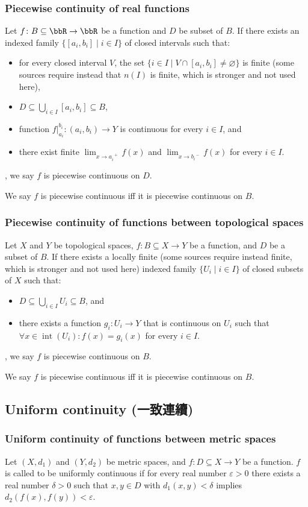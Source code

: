 \begin{itemize}
\begin{itemize}
\subsubsection{Piecewise continuity of real functions}
Let $f\colon B\subseteq\bbR\to\bbR$ be a function and $D$ be subset of $B$. If there exists an indexed family $\{[a_i,b_i]\mid i\in I\}$ of closed intervals such that:
\begin{itemize}
\item for every closed interval $V$, the set $\{i\in I\mid V\cap [a_i,b_i]\neq\varnothing\}$ is finite (some sources require instead that $n(I)$ is finite, which is stronger and not used here),
\item $D\subseteq\bigcup_{i\in I}[a_i,b_i]\subseteq B$,
\item function $f\big\vert_{a_i}^{b_i}\colon(a_i,b_i)\to Y$ is continuous for every $i\in I$, and
\item there exist finite $\lim_{x\to a_i^{\phantom{i}+}}f(x)$ and $\lim_{x\to b_i^{\phantom{i}-}}f(x)$ for every $i\in I$.
\end{itemize},
we say $f$ is piecewise continuous on $D$.

We say $f$ is piecewise continuous iff it is piecewise continuous on $B$.
\subsubsection{Piecewise continuity of functions between topological spaces}
Let $X$ and $Y$ be topological spaces, $f\colon B\subseteq X\to Y$ be a function, and $D$ be a subset of $B$. If there exists a locally finite (some sources require instead finite, which is stronger and not used here) indexed family $\{U_i\mid i\in I\}$ of closed subsets of $X$ such that:
\begin{itemize}
\item $D\subseteq\bigcup_{i\in I}U_i\subseteq B$, and
\item there exists a function $g_i\colon U_i\to Y$ that is continuous on $U_i$ such that $\forall x\in\operatorname{int}\left(U_i\right)\colon f(x)=g_i(x)$ for every $i\in I$.
\end{itemize},
we say $f$ is piecewise continuous on $B$.

We say $f$ is piecewise continuous iff it is piecewise continuous on $B$.
\subsection{Uniform continuity (一致連續)}
\subsubsection{Uniform continuity of functions between metric spaces}
Let $(X,d_1)$ and $(Y,d_2)$ be metric spaces, and $f\colon D\subseteq X\to Y$ be a function. $f$ is called to be uniformly continuous if for every real number $\varepsilon >0$ there exists a real number $\delta >0$ such that $x,y\in D$ with $d_{1}(x,y)<\delta$ implies $d_{2}(f(x),f(y))<\varepsilon$.


\end{itemize}
\end{itemize}
